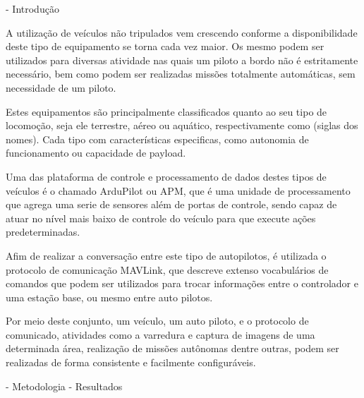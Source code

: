 - Introdução

A utilização de veículos não tripulados vem crescendo conforme a disponibilidade deste tipo de equipamento se torna cada vez maior. Os mesmo podem ser utilizados para diversas atividade nas quais um piloto a bordo não é estritamente necessário, bem como podem ser realizadas missões totalmente automáticas, sem necessidade de um piloto.

Estes equipamentos são principalmente classificados quanto ao seu tipo de locomoção, seja ele terrestre, aéreo ou aquático, respectivamente como (siglas dos nomes). Cada tipo com características especificas, como autonomia de funcionamento ou capacidade de payload.

Uma das plataforma de controle e processamento de dados destes tipos de veículos é o chamado ArduPilot ou APM, que é uma unidade de processamento que agrega uma serie de sensores além de portas de controle, sendo capaz de atuar no nível mais baixo de controle do veículo para que execute ações predeterminadas.

Afim de realizar a conversação entre este tipo de autopilotos, é utilizada o protocolo de comunicação MAVLink, que descreve  extenso vocabulários de comandos que podem ser utilizados para trocar informações entre o controlador e uma estação base, ou mesmo entre auto pilotos.

Por meio deste conjunto, um veículo, um auto piloto, e o protocolo de comunicado, atividades como a varredura e captura de imagens de uma determinada área, realização de missões autônomas dentre outras, podem ser realizadas de forma consistente e facilmente configuráveis.

- Metodologia
- Resultados
